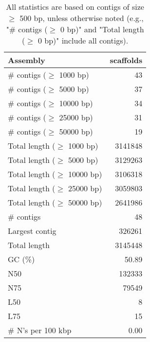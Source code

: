 \documentclass[12pt,a4paper]{article}
\begin{document}
\begin{table}[ht]
\begin{center}
\caption{All statistics are based on contigs of size $\geq$ 500 bp, unless otherwise noted (e.g., "\# contigs ($\geq$ 0 bp)" and "Total length ($\geq$ 0 bp)" include all contigs).}
\begin{tabular}{|l*{1}{|r}|}
\hline
Assembly & scaffolds \\ \hline
\# contigs ($\geq$ 1000 bp) & 43 \\ \hline
\# contigs ($\geq$ 5000 bp) & 37 \\ \hline
\# contigs ($\geq$ 10000 bp) & 34 \\ \hline
\# contigs ($\geq$ 25000 bp) & 31 \\ \hline
\# contigs ($\geq$ 50000 bp) & 19 \\ \hline
Total length ($\geq$ 1000 bp) & 3141848 \\ \hline
Total length ($\geq$ 5000 bp) & 3129263 \\ \hline
Total length ($\geq$ 10000 bp) & 3106318 \\ \hline
Total length ($\geq$ 25000 bp) & 3059803 \\ \hline
Total length ($\geq$ 50000 bp) & 2641986 \\ \hline
\# contigs & 48 \\ \hline
Largest contig & 326261 \\ \hline
Total length & 3145448 \\ \hline
GC (\%) & 50.89 \\ \hline
N50 & 132333 \\ \hline
N75 & 79549 \\ \hline
L50 & 8 \\ \hline
L75 & 15 \\ \hline
\# N's per 100 kbp & 0.00 \\ \hline
\end{tabular}
\end{center}
\end{table}
\end{document}
